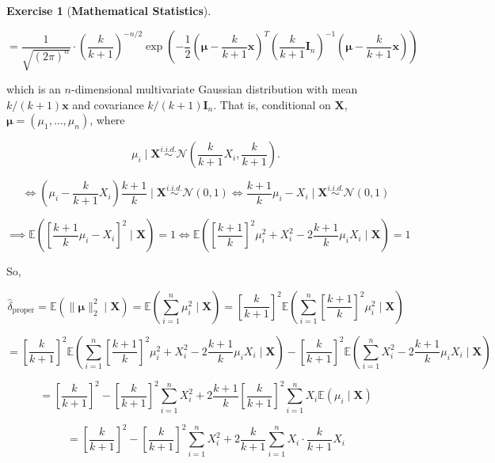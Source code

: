 \documentclass{article}
\theoremstyle{definition}
\newtheorem{exercise}{Exercise}
\theoremstyle{definition}
\theoremstyle{definition}
\theoremstyle{definition}
\theoremstyle{definition}
\newcommand{\E}{\mathbb{E}}
\begin{document}
\begin{exercise}[\textbf{Mathematical Statistics}]
\begin{enumerate}[(a)]
\[
=
 \frac{1}{\sqrt{(2 \pi)^n}}  \cdot \left( \frac{k}{k+1} \right)^{-n/2}   \exp \left(-  \frac{1}{2}   \left( \boldsymbol{\mu} -  \frac{k}{k+1}  \boldsymbol{x} \right) ^T \left( \frac{k}{k+1}\boldsymbol{I}_n \right)^{-1} \left( \boldsymbol{\mu} -  \frac{k}{k+1} \boldsymbol{x} \right)  \right)
 \]
 
which is an \(n\)-dimensional multivariate Gaussian distribution with mean \(k/(k+1) \boldsymbol{x}\) and covariance \(k/(k+1) \boldsymbol{I}_n\). That is, conditional on \(\boldsymbol{X}\), \(\boldsymbol{\mu} = (\mu_1, \ldots, \mu_n)\), where

\[
\mu_i \mid \boldsymbol{X}  \overset{i.i.d.}{\sim} \mathcal{N} \left( \frac{k}{k+1} X_i, \frac{k}{k+1}\right).
\]

\[
\iff \left( \mu_i - \frac{k}{k+1}  X_i \right) \frac{k+1}{k}  \mid \boldsymbol{X}\overset{i.i.d.}{\sim} \mathcal{N} \left(0, 1\right) \iff \frac{k+1}{k} \mu_i -   X_i  \mid \boldsymbol{X} \overset{i.i.d.}{\sim} \mathcal{N} \left(0, 1\right)
\]

\begin{equation}
\implies  \E \left( \left[ \frac{k+1}{k} \mu_i -   X_i \right]^2  \mid \boldsymbol{X}  \right) = 1  \iff   \E \left( \left[ \frac{k+1}{k} \right]^2 \mu_i  ^2  + X_i^2 - 2 \frac{k+1}{k} \mu_i X_i  \mid \boldsymbol{X}  \right) = 1 
\end{equation}

So,

\[
\hat{\delta}_{\text{proper}} = \E \left( \lVert \boldsymbol{\mu} \rVert_2^2 \mid \boldsymbol{X} \right) = \E \left( \sum_{i=1}^n \mu_i^2 \mid \boldsymbol{X}  \right) = \left[ \frac{k}{k+1} \right]^2 \E \left( \sum_{i=1}^n \left[ \frac{k+1}{k} \right]^2 \mu_i^2 \mid \boldsymbol{X}  \right)
\]

\[
= \left[ \frac{k}{k+1} \right]^2 \E \left( \sum_{i=1}^n \left[ \frac{k+1}{k} \right]^2 \mu_i  ^2  + X_i^2 - 2 \frac{k+1}{k} \mu_i X_i  \mid \boldsymbol{X}  \right)  -  \left[ \frac{k}{k+1} \right]^2 \E \left( \sum_{i=1}^n X_i^2 - 2 \frac{k+1}{k} \mu_i X_i  \mid \boldsymbol{X}  \right) 
\] 

\[
= \left[ \frac{k}{k+1} \right]^2  - \left[ \frac{k}{k+1} \right]^2 \sum_{i=1}^n X_i^2 + 2 \frac{k+1}{k} \left[ \frac{k}{k+1} \right]^2   \sum_{i=1}^n X_i   \E \left( \mu_i \mid \boldsymbol{X}  \right) 
\] 

\[
= \left[ \frac{k}{k+1} \right]^2  - \left[ \frac{k}{k+1} \right]^2 \sum_{i=1}^n X_i^2 + 2 \frac{k}{k+1} \sum_{i=1}^n    X_i   \cdot \frac{k}{k+1} X_i
\] 


\end{enumerate}
\end{exercise}
\end{document}
